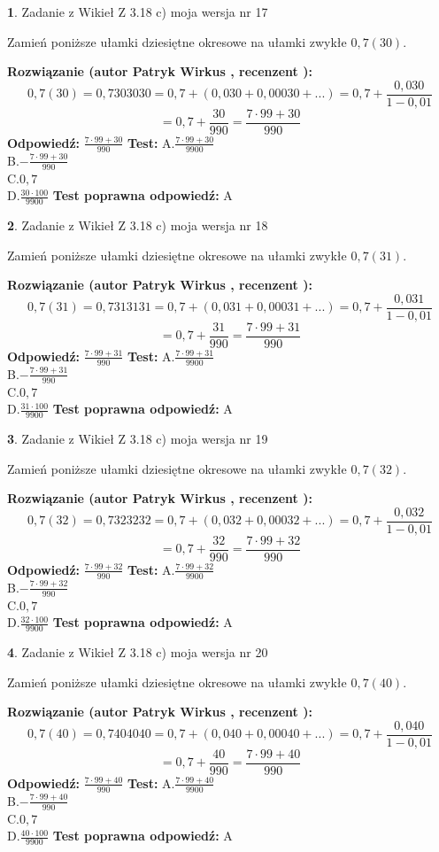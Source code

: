 \documentclass[12pt, a4paper]{article}
\theoremstyle{definition} %
\newtheorem{zad}{}
\newcommand{\zadStart}[1]{\begin{zad}#1\newline}
\newcommand{\zadStop}{\end{zad}}
\newcommand{\rozwStart}[2]{\noindent \textbf{Rozwiązanie (autor #1 , recenzent #2): }\newline}
\newcommand{\rozwStop}{\newline}
\newcommand{\odpStart}{\noindent \textbf{Odpowiedź:}\newline}
\newcommand{\odpStop}{\newline}
\newcommand{\testStart}{\noindent \textbf{Test:}\newline}
\newcommand{\testStop}{\newline}
\newcommand{\kluczStart}{\noindent \textbf{Test poprawna odpowiedź:}\newline}
\newcommand{\kluczStop}{\newline}
\begin{document}
\zadStart{Zadanie z Wikieł Z 3.18 c) moja wersja nr 17}

Zamień poniższe ułamki dziesiętne okresowe na ułamki zwykłe $0,7(30)$.
\zadStop
\rozwStart{Patryk Wirkus}{}
$$0,7(30)=0,7303030=0,7+(0,030+0,00030+...)=0,7+\frac{0,030}{1-0,01}$$
$$=0,7+\frac{30}{990}=\frac{7\cdot99+30}{990}$$
\rozwStop
\odpStart
$\frac{7\cdot99+30}{990}$
\odpStop
\testStart
A.$\frac{7\cdot99+30}{9900}$\\ B.$-\frac{7\cdot99+30}{990}$\\ C.$0,7$\\ D.$\frac{30\cdot100}{9900}$
\testStop
\kluczStart
A
\kluczStop



\zadStart{Zadanie z Wikieł Z 3.18 c) moja wersja nr 18}

Zamień poniższe ułamki dziesiętne okresowe na ułamki zwykłe $0,7(31)$.
\zadStop
\rozwStart{Patryk Wirkus}{}
$$0,7(31)=0,7313131=0,7+(0,031+0,00031+...)=0,7+\frac{0,031}{1-0,01}$$
$$=0,7+\frac{31}{990}=\frac{7\cdot99+31}{990}$$
\rozwStop
\odpStart
$\frac{7\cdot99+31}{990}$
\odpStop
\testStart
A.$\frac{7\cdot99+31}{9900}$\\ B.$-\frac{7\cdot99+31}{990}$\\ C.$0,7$\\ D.$\frac{31\cdot100}{9900}$
\testStop
\kluczStart
A
\kluczStop



\zadStart{Zadanie z Wikieł Z 3.18 c) moja wersja nr 19}

Zamień poniższe ułamki dziesiętne okresowe na ułamki zwykłe $0,7(32)$.
\zadStop
\rozwStart{Patryk Wirkus}{}
$$0,7(32)=0,7323232=0,7+(0,032+0,00032+...)=0,7+\frac{0,032}{1-0,01}$$
$$=0,7+\frac{32}{990}=\frac{7\cdot99+32}{990}$$
\rozwStop
\odpStart
$\frac{7\cdot99+32}{990}$
\odpStop
\testStart
A.$\frac{7\cdot99+32}{9900}$\\ B.$-\frac{7\cdot99+32}{990}$\\ C.$0,7$\\ D.$\frac{32\cdot100}{9900}$
\testStop
\kluczStart
A
\kluczStop



\zadStart{Zadanie z Wikieł Z 3.18 c) moja wersja nr 20}

Zamień poniższe ułamki dziesiętne okresowe na ułamki zwykłe $0,7(40)$.
\zadStop
\rozwStart{Patryk Wirkus}{}
$$0,7(40)=0,7404040=0,7+(0,040+0,00040+...)=0,7+\frac{0,040}{1-0,01}$$
$$=0,7+\frac{40}{990}=\frac{7\cdot99+40}{990}$$
\rozwStop
\odpStart
$\frac{7\cdot99+40}{990}$
\odpStop
\testStart
A.$\frac{7\cdot99+40}{9900}$\\ B.$-\frac{7\cdot99+40}{990}$\\ C.$0,7$\\ D.$\frac{40\cdot100}{9900}$
\testStop
\kluczStart
A
\kluczStop
\end{document}
